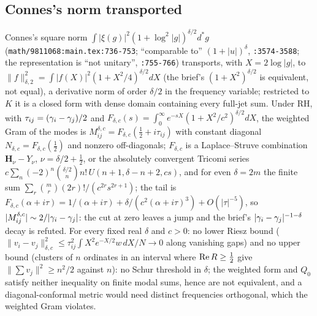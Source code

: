 \subsection{Connes's norm transported}

\begin{theorem}
\label{thm:connes-norm-transported}
Connes's square norm $\int|\xi(g)|^2(1+\log^2|g|)^{\delta/2}d^{*}g$ (\texttt{math/9811068:main.tex:736-753}; ``comparable to''
$(1+|u|)^\delta$, \texttt{:3574-3588}; the representation is ``not unitary'', \texttt{:755-766}) transports, with $X = 2\log|g|$, to
$\|f\|^2_{\delta,2} = \int|f(X)|^2(1+X^2/4)^{\delta/2}dX$ (the brief's $(1+X^2)^{\delta/2}$ is equivalent, not equal), a derivative norm of
order $\delta/2$ in the frequency variable; restricted to $K$ it is a closed form with dense domain containing every full-jet
sum. Under RH, with $\tau_{ij} = (\gamma_{i}-\gamma_{j})/2$ and $F_{\delta,c}(s) = \int_0^\infty e^{-sX}(1+X^2/c^2)^{\delta/2}dX$, the weighted Gram of the
modes is $M^{\delta,c}_{ij} = F_{\delta,c}(\tfrac12+i\tau_{ij})$ with constant diagonal $N_{\delta,c} = F_{\delta,c}(\tfrac12)$ and nonzero off-diagonals;
$F_{\delta,c}$ is a Laplace--Struve combination $\mathbf H_{\nu}-Y_{\nu}$, $\nu = \delta/2+\tfrac12$, or the absolutely convergent Tricomi series
$c\sum_n(-2)^n\binom{\delta/2}n n!\,U(n+1,\delta-n+2,cs)$, and for even $\delta = 2m$ the finite sum $\sum_r\binom mr(2r)!/(c^{2r}s^{2r+1})$; the tail
is $F_{\delta,c}(\alpha+i\tau) = 1/(\alpha+i\tau)+\delta/(c^2(\alpha+i\tau)^3)+O(|\tau|^{-5})$, so $|M^{\delta,c}_{ij}|\sim2/|\gamma_{i}-\gamma_{j}|$: the cut at zero
leaves a jump and the brief's $|\gamma_{i}-\gamma_{j}|^{-1-\delta}$ decay is refuted. For every fixed real $\delta$ and $c>0$: no lower Riesz bound
($\|v_i-v_j\|^2_{\delta,c}\le\tau_{ij}^2\int X^2e^{-X/2}w\,dX/N\to0$ along vanishing gaps) and no upper bound (clusters of $n$ ordinates in an
interval where $\operatorname{Re} R\ge\tfrac12$ give $\|\sum v_j\|^2\ge n^2/2$ against $n$): no Schur threshold in $\delta$; the weighted form and $Q_0$
satisfy neither inequality on finite modal sums, hence are not equivalent, and a diagonal-conformal metric would need
distinct frequencies orthogonal, which the weighted Gram violates.
\end{theorem}

